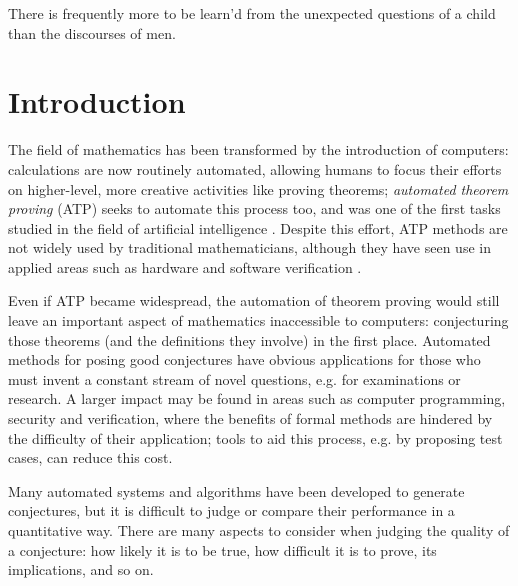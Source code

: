 \documentclass[12pt]{article}
\begin{document}
\maketitle

\begin{abstract}

\end{abstract}

\begin{displayquote}
  There is frequently more to be learn'd from the unexpected questions of a
  child than the discourses of men.
\end{displayquote}

\section{Introduction}

The field of mathematics has been transformed by the introduction of computers:
calculations are now routinely automated, allowing humans to focus their efforts
on higher-level, more creative activities like proving theorems; \emph{automated
theorem proving} (ATP) seeks to automate this process too, and was one of the
first tasks studied in the field of artificial intelligence
\cite{newell1956logic, sutcliffe2001evaluating}. Despite this effort, ATP
methods are not widely used by traditional mathematicians, although they have
seen use in applied areas such as hardware and software verification
\cite{Moore:2003}.

Even if ATP became widespread, the automation of theorem proving would still
leave an important aspect of mathematics inaccessible to computers: conjecturing
those theorems (and the definitions they involve) in the first place. Automated
methods for posing good conjectures have obvious applications for those who must
invent a constant stream of novel questions, e.g. for examinations or research.
A larger impact may be found in areas such as computer programming, security and
verification, where the benefits of formal methods are hindered by the
difficulty of their application; tools to aid this process, e.g. by proposing
test cases, can reduce this cost.

Many automated systems and algorithms have been developed to generate
conjectures, but it is difficult to judge or compare their performance in a
quantitative way. There are many aspects to consider when judging the quality of
a conjecture: how likely it is to be true, how difficult it is to prove, its
implications, and so on.
\end{document}
